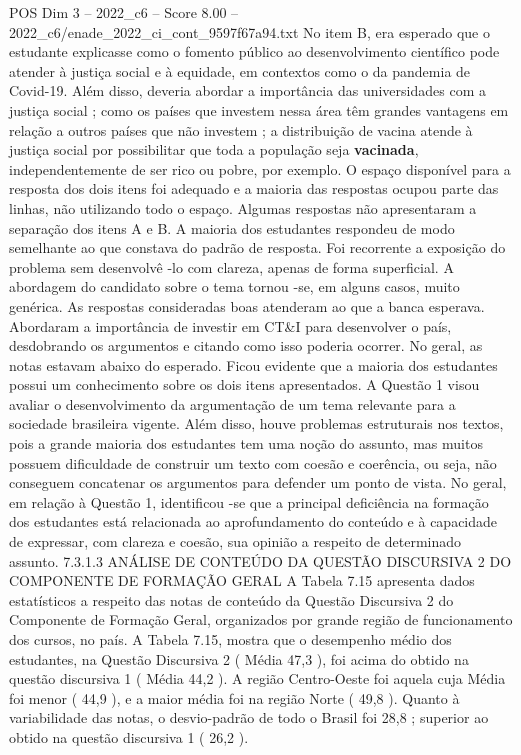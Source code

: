 \begin{textsample}{POS Dim 3 – 2022\_c6 – Score 8.00 – 2022\_c6/enade\_2022\_ci\_cont\_9597f67a94.txt}
No item B, era esperado que o estudante explicasse como o fomento público ao desenvolvimento científico pode atender à justiça social e à equidade, em contextos como o da pandemia de Covid-19.
Além disso, deveria abordar a importância das universidades com a justiça social ; como os países que investem nessa área têm grandes vantagens em relação a outros países que não investem ; a distribuição de vacina atende à justiça social por possibilitar que toda a população seja \textbf{vacinada}, independentemente de ser rico ou pobre, por exemplo.
O espaço disponível para a resposta dos dois itens foi adequado e a maioria das respostas ocupou parte das linhas, não utilizando todo o espaço.
Algumas respostas não apresentaram a separação dos itens A e B.
A maioria dos estudantes respondeu de modo semelhante ao que constava do padrão de resposta.
Foi recorrente a exposição do problema sem desenvolvê -lo com clareza, apenas de forma superficial.
A abordagem do candidato sobre o tema tornou -se, em alguns casos, muito genérica.
As respostas consideradas boas atenderam ao que a banca esperava.
Abordaram a importância de investir em CT\&I para desenvolver o país, desdobrando os argumentos e citando como isso poderia ocorrer.
No geral, as notas estavam abaixo do esperado.
Ficou evidente que a maioria dos estudantes possui um conhecimento sobre os dois itens apresentados.
A Questão 1 visou avaliar o desenvolvimento da argumentação de um tema relevante para a sociedade brasileira vigente.
Além disso, houve problemas estruturais nos textos, pois a grande maioria dos estudantes tem uma noção do assunto, mas muitos possuem dificuldade de construir um texto com coesão e coerência, ou seja, não conseguem concatenar os argumentos para defender um ponto de vista.
No geral, em relação à Questão 1, identificou -se que a principal deficiência na formação dos estudantes está relacionada ao aprofundamento do conteúdo e à capacidade de expressar, com clareza e coesão, sua opinião a respeito de determinado assunto. 7.3.1.3 ANÁLISE DE CONTEÚDO DA QUESTÃO DISCURSIVA 2 DO COMPONENTE DE FORMAÇÃO GERAL A Tabela 7.15 apresenta dados estatísticos a respeito das notas de conteúdo da Questão Discursiva 2 do Componente de Formação Geral, organizados por grande região de funcionamento dos cursos, no país.
A Tabela 7.15, mostra que o desempenho médio dos estudantes, na Questão Discursiva 2 ( Média 47,3 ), foi acima do obtido na questão discursiva 1 ( Média 44,2 ).
A região Centro-Oeste foi aquela cuja Média foi menor ( 44,9 ), e a maior média foi na região Norte ( 49,8 ).
Quanto à variabilidade das notas, o desvio-padrão de todo o Brasil foi 28,8 ; superior ao obtido na questão discursiva 1 ( 26,2 ).

\end{textsample}

